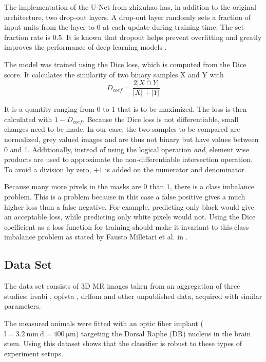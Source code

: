 The implementation of the U-Net from zhixuhao has, in addition to the original architecture, two drop-out layers.
A drop-out layer randomly sets a fraction of input units from the layer to 0 at each update during training time.
The set fraction rate is 0.5.
It is known that dropout helps prevent overfitting and greatly improves the performance of deep learning models \cite{srivastava2014dropout}.

The model was trained using the Dice loss, which is computed from the Dice score.
It calculates the similarity of two binary samples X and Y with
\begin{equation}\label{eqDcoef}
D_{coef} = \frac{2|X\cap Y|}{|X|+|Y|}
\end{equation}

It is a quantity ranging from 0 to 1 that is to be maximized.
The loss is then calculated with $1-D_{coef}$.
Because the Dice loss is not differentiable, small changes need to be made.
In our case, the two samples to be compared are normalized, grey valued images and are thus not binary but have values between 0 and 1.
Additionally, instead of using the logical operation \textit{and}, element wise products are used to approximate the non-differentiable intersection operation.
To avoid a division by zero, $+1$ is added on the numerator and denominator.

Because many more pixels in the masks are 0 than 1, there is a class imbalance problem.
This is a problem because in this case a false positive gives a much higher loss than a false negative.
For example, predicting only black would give an acceptable loss, while predicting only white pixels would not.
Using the Dice coefficient as a loss function for training should make it invariant to this class imbalance problem as stated by Fausto Milletari et al. in \cite{milletari_v-net:_2016}.

\subsection{Data Set} \label{subsec:Data Set}
The data set consists of 3D MR images taken from an aggregation of three studies: irsabi \cite{irsabi_bidsdata}, opfvta \cite{ioanas_whole-brain_nodate}, drlfom \cite{ioanas_effects_nodate} and other unpublished data, acquired with similar parameters.

The measured animals were fitted with an optic fiber implant ($\mathrm{l=\SI{3.2}{\milli\meter} \ d=\SI{400}{\micro\meter}}$) targeting the Dorsal Raphe (DR) nucleus in the brain stem.
Using this dataset shows that the classifier is robust to these types of experiment setups.

